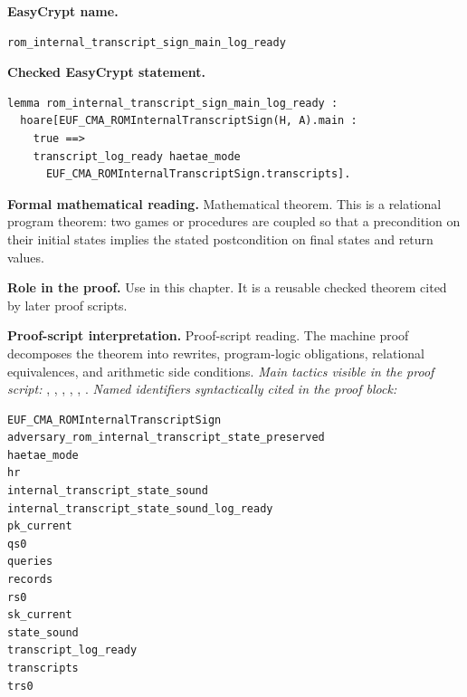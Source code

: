 \begin{formaltheorem}
\noindent\textbf{EasyCrypt name.}
\begin{lstlisting}[language=EasyCrypt,basicstyle=\ttfamily\scriptsize]
rom_internal_transcript_sign_main_log_ready
\end{lstlisting}
\noindent\textbf{Checked EasyCrypt statement.}
\begin{lstlisting}[language=EasyCrypt,basicstyle=\ttfamily\scriptsize]
lemma rom_internal_transcript_sign_main_log_ready :
  hoare[EUF_CMA_ROMInternalTranscriptSign(H, A).main :
    true ==>
    transcript_log_ready haetae_mode
      EUF_CMA_ROMInternalTranscriptSign.transcripts].
\end{lstlisting}
\noindent\textbf{Formal mathematical reading.}
Mathematical theorem. This is a relational program theorem: two games or procedures are coupled so that a precondition on their initial states implies the stated postcondition on final states and return values.

\noindent\textbf{Role in the proof.}
Use in this chapter. It is a reusable checked theorem cited by later proof scripts.

\noindent\textbf{Proof-script interpretation.}
Proof-script reading. The machine proof decomposes the theorem into rewrites, program-logic obligations, relational equivalences, and arithmetic side conditions.
\emph{Main tactics visible in the proof script:} , , , , , .
\emph{Named identifiers syntactically cited in the proof block:}
\begin{lstlisting}[language=EasyCrypt,basicstyle=\ttfamily\scriptsize]
EUF_CMA_ROMInternalTranscriptSign
adversary_rom_internal_transcript_state_preserved
haetae_mode
hr
internal_transcript_state_sound
internal_transcript_state_sound_log_ready
pk_current
qs0
queries
records
rs0
sk_current
state_sound
transcript_log_ready
transcripts
trs0
\end{lstlisting}

\end{formaltheorem}

